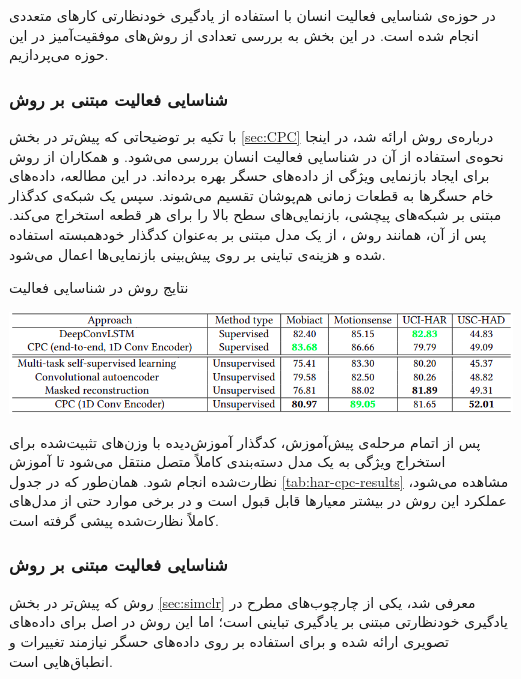 در حوزه‌ی شناسایی فعالیت انسان با استفاده از یادگیری خودنظارتی کارهای متعددی انجام شده است. در این بخش به بررسی تعدادی از روش‌های موفقیت‌آمیز در این حوزه می‌پردازیم.

\subsubsection{شناسایی فعالیت مبتنی بر روش }

با تکیه بر توضیحاتی که پیش‌تر در بخش \ref{sec:CPC} درباره‌ی روش \cite{oord2018representation} ارائه شد، در اینجا نحوه‌ی استفاده از آن در شناسایی فعالیت انسان بررسی می‌شود.  و همکاران\cite{haresamudram2021contrastive} از روش  برای ایجاد بازنمایی ویژگی از داده‌های حسگر بهره برده‌اند. در این مطالعه، داده‌های خام حسگرها به قطعات زمانی هم‌پوشان تقسیم می‌شوند. سپس یک شبکه‌ی کدگذار مبتنی بر شبکه‌های پیچشی، بازنمایی‌های سطح بالا را برای هر قطعه استخراج می‌کند. پس از آن، همانند روش ، از یک مدل مبتنی بر  به‌عنوان کدگذار خودهمبسته استفاده شده و هزینه‌ی تباینی بر روی پیش‌بینی بازنمایی‌ها اعمال می‌شود.

\begin{table}[htbp]
\centering
\caption{نتایج روش  در شناسایی فعالیت}
\includegraphics[width=1\textwidth]{Images/Chapter2/har-cpc-results.png}
\label{tab:har-cpc-results}
\end{table}

پس از اتمام مرحله‌ی پیش‌آموزش، کدگذار آموزش‌دیده با وزن‌های تثبیت‌شده برای استخراج ویژگی به یک مدل دسته‌بندی کاملاً متصل منتقل می‌شود تا آموزش نظارت‌شده انجام شود. همان‌طور که در جدول \ref{tab:har-cpc-results} مشاهده می‌شود، عملکرد این روش در بیشتر معیارها قابل قبول است و در برخی موارد حتی از مدل‌های کاملاً نظارت‌شده پیشی گرفته است.

\subsubsection{شناسایی فعالیت مبتنی بر روش }

روش \cite{chen2020simple} که پیش‌تر در بخش \ref{sec:simclr} معرفی شد، یکی از چارچوب‌های مطرح در یادگیری خودنظارتی مبتنی بر یادگیری تباینی است؛ اما این روش در اصل برای داده‌های تصویری ارائه شده و برای استفاده بر روی داده‌های حسگر نیازمند تغییرات و انطباق‌هایی است.


